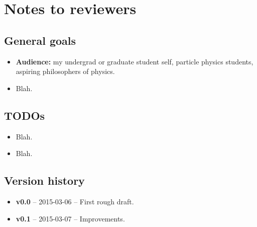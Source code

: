 \section{Notes to reviewers}
\label{sec:notes-to-reviewers}


\subsection{General goals}

\begin{itemize}
    \item \textbf{Audience:}
          my undergrad or graduate student self,
          particle physics students,
          aspiring philosophers of physics.
    \item Blah.
\end{itemize}


\subsection{TODOs}

\begin{itemize}
    \item Blah.
    \item Blah.
\end{itemize}


\subsection{Version history}

\begin{itemize}
    \item \textbf{v0.0} -- 2015-03-06 --
          First rough draft.
    \item \textbf{v0.1} -- 2015-03-07 --
          Improvements.
\end{itemize}


